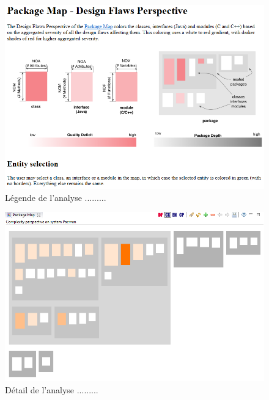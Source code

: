 \documentclass[12pt,a4paper,final]{article}
\begin{document}
\begin{figure}[ht]
	\centering
	\includegraphics[width=\textwidth]{images/InCodeDesignFlawsLegende.png}
	\caption{\label{incodeDFLeg}Légende de l'analyse .........}
\end{figure}

\begin{figure}[ht]
	\centering
	\includegraphics[width=\textwidth]{images/InCodeComplexity.png}
	\caption{\label{incodeCompl}Détail de l'analyse .........}
\end{figure}
\end{document}

